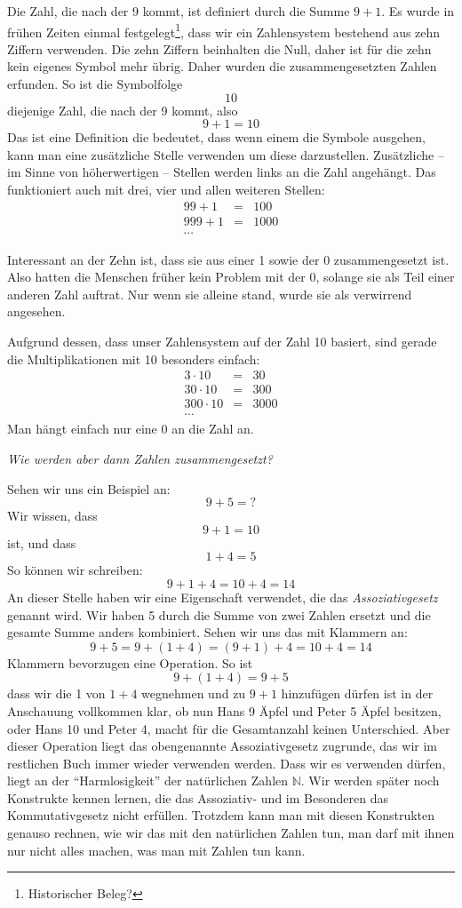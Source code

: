 Die Zahl, die nach der 9 kommt, ist definiert durch die Summe $9+1$. Es wurde in frühen Zeiten einmal festgelegt\footnote{Historischer Beleg?}, dass wir ein Zahlensystem bestehend aus zehn Ziffern verwenden. Die zehn Ziffern beinhalten die Null, daher ist für die zehn kein eigenes Symbol mehr übrig. Daher wurden die zusammengesetzten Zahlen erfunden. So ist die Symbolfolge
\[10\]
diejenige Zahl, die nach der 9 kommt, also
\[9+1=10\]
Das ist eine Definition die bedeutet, dass wenn einem die Symbole ausgehen, kann man eine zusätzliche Stelle verwenden um diese darzustellen. Zusätzliche -- im Sinne von höherwertigen -- Stellen werden links an die Zahl angehängt. Das funktioniert auch mit drei, vier und allen weiteren Stellen:
\begin{eqnarray*}
99+1 &=& 100 \\
999+1 &=& 1000 \\
\cdots
\end{eqnarray*}

Interessant an der Zehn ist, dass sie aus einer 1 sowie der 0 zusammengesetzt ist. Also hatten die Menschen früher kein Problem mit der 0, solange sie als Teil einer anderen Zahl auftrat. Nur wenn sie alleine stand, wurde sie als verwirrend angesehen.

Aufgrund dessen, dass unser Zahlensystem auf der Zahl 10 basiert, sind gerade die Multiplikationen mit 10 besonders einfach: 
\begin{eqnarray*}
3\cdot 10 &=& 30 \\
30\cdot 10 &=& 300 \\
300\cdot 10 &=& 3000\\
\cdots
\end{eqnarray*}
Man hängt einfach nur eine 0 an die Zahl an.

\bigskip

\noindent \textsl{Wie werden aber dann Zahlen zusammengesetzt?}

\noindent Sehen wir uns ein Beispiel an:
\[9+5 = ?\]
Wir wissen, dass 
\[9+1 = 10\]
ist, und dass
\[1+4 = 5\]
So können wir schreiben:
\[9+1+4 = 10 + 4 = 14\]
An dieser Stelle haben wir eine Eigenschaft verwendet, die das \textsl{Assoziativgesetz} genannt wird. Wir haben 5 durch die Summe von zwei Zahlen ersetzt und die gesamte Summe anders kombiniert. Sehen wir uns das mit Klammern an:
\[9+5 = 9+(1+4) = (9+1)+4 = 10+4 = 14\]
Klammern bevorzugen eine Operation. So ist
\[9+(1+4)=9+5\]
dass wir die 1 von $1+4$ wegnehmen und zu $9+1$ hinzufügen dürfen ist in der Anschauung vollkommen klar, ob nun Hans 9 Äpfel und Peter 5 Äpfel besitzen, oder Hans 10 und Peter 4, macht für die Gesamtanzahl keinen Unterschied. Aber dieser Operation liegt das obengenannte Assoziativgesetz zugrunde, das wir im restlichen Buch immer wieder verwenden werden. Dass wir es verwenden dürfen, liegt an der "`Harmlosigkeit"' der natürlichen Zahlen $\mathbb{N}$. Wir werden später noch Konstrukte kennen lernen, die das Assoziativ- und im Besonderen das Kommutativgesetz nicht erfüllen. Trotzdem kann man mit diesen Konstrukten genauso rechnen, wie wir das mit den natürlichen Zahlen tun, man darf mit ihnen nur nicht alles machen, was man mit Zahlen tun kann.

